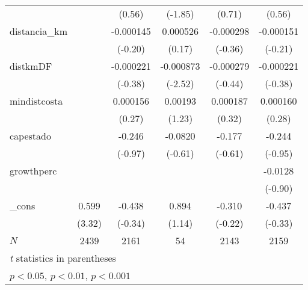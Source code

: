 {\begin{tabular}{l*{5}{c}}
            &                     &      (0.56)         &     (-1.85)         &      (0.71)         &      (0.56)         \\
[1em]
distancia\_km&                     &   -0.000145         &    0.000526         &   -0.000298         &   -0.000151         \\
            &                     &     (-0.20)         &      (0.17)         &     (-0.36)         &     (-0.21)         \\
[1em]
distkmDF    &                     &   -0.000221         &   -0.000873\sym{*}  &   -0.000279         &   -0.000221         \\
            &                     &     (-0.38)         &     (-2.52)         &     (-0.44)         &     (-0.38)         \\
[1em]
mindistcosta&                     &    0.000156         &     0.00193         &    0.000187         &    0.000160         \\
            &                     &      (0.27)         &      (1.23)         &      (0.32)         &      (0.28)         \\
[1em]
capestado   &                     &      -0.246         &     -0.0820         &      -0.177         &      -0.244         \\
            &                     &     (-0.97)         &     (-0.61)         &     (-0.61)         &     (-0.95)         \\
[1em]
growthperc  &                     &                     &                     &                     &     -0.0128         \\
            &                     &                     &                     &                     &     (-0.90)         \\
[1em]
\_cons      &       0.599\sym{***}&      -0.438         &       0.894         &      -0.310         &      -0.437         \\
            &      (3.32)         &     (-0.34)         &      (1.14)         &     (-0.22)         &     (-0.33)         \\
\hline
\(N\)       &        2439         &        2161         &          54         &        2143         &        2159         \\
\hline\hline
\multicolumn{6}{l}{\footnotesize \textit{t} statistics in parentheses}\\
\multicolumn{6}{l}{\footnotesize \sym{*} \(p<0.05\), \sym{**} \(p<0.01\), \sym{***} \(p<0.001\)}\\
\end{tabular}
}
